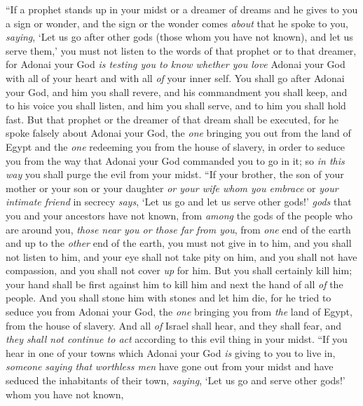 \begin{biblechapter} %
\verse “If a prophet stands up in your midst or a dreamer of dreams and he gives to you a sign or wonder,
\verse and the sign or the wonder comes \textit{about} that he spoke to you, \textit{saying}, ‘Let us go after other gods (those whom you have not known), and let us serve them,’
\verse you must not listen to the words of that prophet or to that dreamer, for Adonai your God \textit{is testing you to know whether you love} Adonai your God with all of your heart and with all \textit{of} your inner self.
\verse You shall go after Adonai your God, and him you shall revere, and his commandment you shall keep, and to his voice you shall listen, and him you shall serve, and to him you shall hold fast.
\verse But that prophet or the dreamer of that dream shall be executed, for he spoke falsely about Adonai your God, the \textit{one} bringing you out from the land of Egypt and the \textit{one} redeeming you from the house of slavery, in order to seduce you from the way that Adonai your God commanded you to go in it; so \textit{in this way} you shall purge the evil from your midst.
\verse “If your brother, the son of your mother or your son or your daughter \textit{or your wife whom you embrace} or \textit{your intimate friend} in secrecy \textit{says}, ‘Let us go and let us serve other gods!’ \textit{gods} that you and your ancestors have not known,
\verse from \textit{among} the gods of the people who are around you, \textit{those near you or those far from you}, from \textit{one} end of the earth and up to the \textit{other} end of the earth,
\verse you must not give in to him, and you shall not listen to him, and your eye shall not take pity on him, and you shall not have compassion, and you shall not cover \textit{up} for him.
\verse But you shall certainly kill him; your hand shall be first against him to kill him and next the hand of all \textit{of} the people.
\verse And you shall stone him with stones and let him die, for he tried to seduce you from Adonai your God, the \textit{one} bringing you from \textit{the} land of Egypt, from the house of slavery.
\verse And all \textit{of} Israel shall hear, and they shall fear, and \textit{they shall not continue to act} according to this evil thing in your midst.
\verse “If you hear in one of your towns which Adonai your God \textit{is} giving to you to live in, \textit{someone} \textit{saying that}
\verse \textit{worthless men} have gone out from your midst and have seduced the inhabitants of their town, \textit{saying}, ‘Let us go and serve other gods!’ whom you have not known,

\end{biblechapter}
